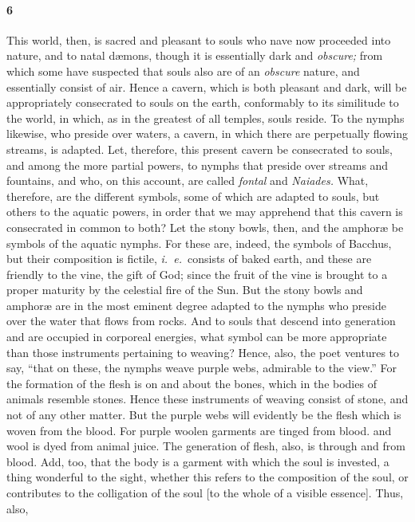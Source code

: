 \documentclass[12pt]{article}
\begin{document}
\paragraph{6} This world, then, is sacred and pleasant to souls who nave now
proceeded into nature, and to natal d{\ae}mons, though it is essentially dark
and \textit{obscure;} from which some have suspected that souls also are of an
\textit{obscure} nature, and essentially consist of air. Hence a cavern, which
is both pleasant and dark, will be appropriately consecrated to souls on the
earth, conformably to its similitude to the world, in which, as in the greatest
of all temples, souls reside. To the nymphs likewise, who preside over waters,
a cavern, in which there are perpetually flowing streams, is adapted. Let,
therefore, this present cavern be consecrated to souls, and among the more
partial powers, to nymphs that preside over streams and fountains, and who, on
this account, are called \textit{fontal} and \textit{Naiades.} What, therefore,
are the different symbols, some of which are adapted to souls, but others to
the aquatic powers, in order that we may apprehend that this cavern is
consecrated in common to both? Let the stony bowls, then, and the amphor{\ae}
be symbols of the aquatic nymphs. For these are, indeed, the symbols of
Bacchus, but their composition is fictile, \textit{i.~e.}~consists of baked
earth, and these are friendly to the vine, the gift of God; since the fruit of
the vine is brought to a proper maturity by the celestial fire of the Sun. But
the stony bowls and amphor{\ae} are in the most eminent degree adapted to the
nymphs who preside over the water that flows from rocks. And to souls that
descend into generation and are occupied in corporeal energies, what symbol can
be more appropriate than those instruments pertaining to weaving? Hence, also,
the poet ventures to say, ``that on these, the nymphs weave purple webs,
admirable to the view.'' For the formation of the flesh is on and about the
bones, which in the bodies of animals resemble stones. Hence these instruments
of weaving consist of stone, and not of any other matter. But the purple webs
will evidently be the flesh which is woven from the blood. For purple woolen
garments are tinged from blood. and wool is dyed from animal juice. The
generation of flesh, also, is through and from blood. Add, too, that the body
is a garment with which the soul is invested, a thing wonderful to the sight,
whether this refers to the composition of the soul, or contributes to the
colligation of the soul [to the whole of a visible essence]. Thus, also,
\end{document}
